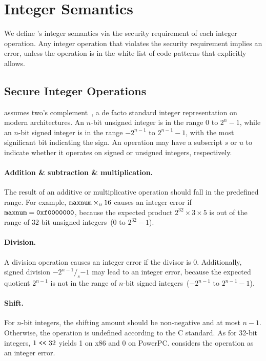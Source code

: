 \section{Integer Semantics}
\label{s:sema}

We define \sys's integer semantics via the security requirement of
each integer operation.  Any integer operation that violates the
security requirement implies an error, unless the operation is in
the white list of code patterns that \sys explicitly allows.

\subsection{Secure Integer Operations}
\label{s:sema:sec}

\sys assumes two's complement~\cite[\chapterautorefname~4.2.1]{intel:vol1},
a de facto standard integer representation on modern architectures.
An $n$-bit unsigned integer is in the range $0$ to $2^n-1$, while
an $n$-bit signed integer is in the range $-2^{n-1}$ to $2^{n-1}-1$,
with the most significant bit indicating the sign.  An operation
may have a subscript $s$ or $u$ to indicate whether it operates on
signed or unsigned integers, respectively.

\paragraph{Addition \& subtraction \& multiplication.}
The result of an additive or multiplicative operation should fall
in the predefined range.  For example,
$\texttt{maxnum}\times_u 16$ causes an integer error if $\texttt{maxnum} =
\texttt{0xf0000000}$, because the expected product $2^{32}\times
3\times 5$ is out of the range of $32$-bit unsigned integers~($0$
to $2^{32} - 1$).

\paragraph{Division.}
A division operation causes an integer error if the divisor is 0.
Additionally, signed division $-2^{n-1} /_s {-1}$ may lead to an integer
error, because the expected quotient $2^{n-1}$ is not in
the range of $n$-bit signed integers~($-2^{n-1}$ to $2^{n-1}-1$).

\paragraph{Shift.}
For $n$-bit integers, the shifting amount should be non-negative
and at most $n-1$.  Otherwise, the operation is undefined according
to the C standard.  As for 32-bit integers, $1 \ \texttt{<}\texttt{<}\  32$ yields 1
on x86 and 0 on PowerPC.  \sys considers the operation as an integer
error.

